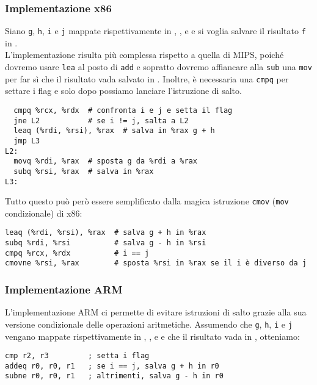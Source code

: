 \documentclass[class=book, crop=false, oneside]{standalone}
\begin{document}
\subsubsection{Implementazione x86}
Siano \texttt{g}, \texttt{h}, \texttt{i} e \texttt{j} mappate rispettivamente in , ,  e  e si voglia salvare il risultato \texttt{f} in .\\
L'implementazione risulta più complessa rispetto a quella di MIPS, poiché dovremo usare \texttt{lea} al posto di \texttt{add} e sopratto dovremo affiancare alla \texttt{sub} una \texttt{mov} per far sì che il risultato vada salvato in . Inoltre, è necessaria una \texttt{cmpq} per settare i flag e solo dopo possiamo lanciare l'istruzione di salto.
\begin{verbatim}
  cmpq %rcx, %rdx  # confronta i e j e setta il flag
  jne L2           # se i != j, salta a L2
  leaq (%rdi, %rsi), %rax  # salva in %rax g + h
  jmp L3
L2:
  movq %rdi, %rax  # sposta g da %rdi a %rax
  subq %rsi, %rax  # salva in %rax
L3:
\end{verbatim}
Tutto questo può però essere semplificato dalla magica istruzione \texttt{cmov} (\texttt{mov} condizionale) di x86:
\begin{verbatim}
leaq (%rdi, %rsi), %rax  # salva g + h in %rax
subq %rdi, %rsi          # salva g - h in %rsi
cmpq %rcx, %rdx          # i == j
cmovne %rsi, %rax        # sposta %rsi in %rax se il i è diverso da j
\end{verbatim}

\subsubsection{Implementazione ARM}
L'implementazione ARM ci permette di evitare istruzioni di salto grazie alla sua versione condizionale delle operazioni aritmetiche. Assumendo che \texttt{g}, \texttt{h}, \texttt{i} e \texttt{j} vengano mappate rispettivamente in , ,  e  e che il risultato vada in , otteniamo:
\begin{verbatim}
cmp r2, r3         ; setta i flag
addeq r0, r0, r1   ; se i == j, salva g + h in r0
subne r0, r0, r1   ; altrimenti, salva g - h in r0
\end{verbatim}
\end{document}
